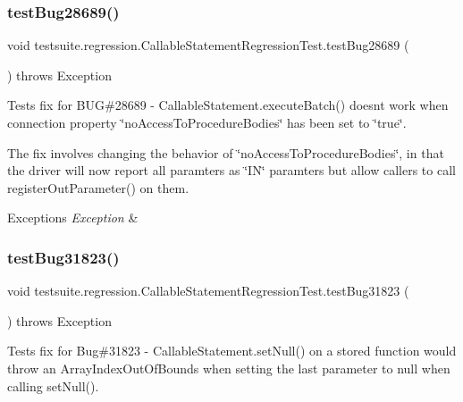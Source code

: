 \subsubsection{\texorpdfstring{test\+Bug28689()}{testBug28689()}}
{\footnotesize\ttfamily void testsuite.\+regression.\+Callable\+Statement\+Regression\+Test.\+test\+Bug28689 (\begin{DoxyParamCaption}{ }\end{DoxyParamCaption}) throws Exception}

Tests fix for B\+UG\#28689 -\/ Callable\+Statement.\+execute\+Batch() doesn\textquotesingle{}t work when connection property \char`\"{}no\+Access\+To\+Procedure\+Bodies\char`\"{} has been set to \char`\"{}true\char`\"{}.

The fix involves changing the behavior of \char`\"{}no\+Access\+To\+Procedure\+Bodies\char`\"{}, in that the driver will now report all paramters as \char`\"{}\+I\+N\char`\"{} paramters but allow callers to call register\+Out\+Parameter() on them.


\begin{DoxyExceptions}{Exceptions}
{\em Exception} & \\
\hline
\end{DoxyExceptions}
\mbox{\label{classtestsuite_1_1regression_1_1_callable_statement_regression_test_a28a91e6259cced18e90ef08947170c38}} 
\subsubsection{\texorpdfstring{test\+Bug31823()}{testBug31823()}}
{\footnotesize\ttfamily void testsuite.\+regression.\+Callable\+Statement\+Regression\+Test.\+test\+Bug31823 (\begin{DoxyParamCaption}{ }\end{DoxyParamCaption}) throws Exception}

Tests fix for Bug\#31823 -\/ Callable\+Statement.\+set\+Null() on a stored function would throw an Array\+Index\+Out\+Of\+Bounds when setting the last parameter to null when calling set\+Null().


